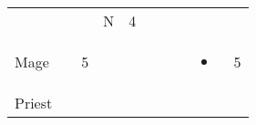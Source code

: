 \documentclass[12pt]{article}
\begin{document}
\begin{longtable}[]{@{}llllllllll@{}}
\begin{minipage}[t]{0.06\columnwidth}
\strut\end{minipage} &
\begin{minipage}[t]{0.06\columnwidth}\raggedright\strut
\strut\end{minipage} &
\begin{minipage}[t]{0.06\columnwidth}\raggedright\strut
\strut\end{minipage} &
\begin{minipage}[t]{0.07\columnwidth}\raggedright\strut
N
\strut\end{minipage} &
\begin{minipage}[t]{0.08\columnwidth}\raggedright\strut
4
\strut\end{minipage}\tabularnewline
\begin{minipage}[t]{0.13\columnwidth}\raggedright\strut
Mage
\strut\end{minipage} &
\begin{minipage}[t]{0.06\columnwidth}\raggedright\strut
\strut\end{minipage} &
\begin{minipage}[t]{0.06\columnwidth}\raggedright\strut
5
\strut\end{minipage} &
\begin{minipage}[t]{0.06\columnwidth}\raggedright\strut
\strut\end{minipage} &
\begin{minipage}[t]{0.06\columnwidth}\raggedright\strut
\strut\end{minipage} &
\begin{minipage}[t]{0.06\columnwidth}\raggedright\strut
\strut\end{minipage} &
\begin{minipage}[t]{0.06\columnwidth}\raggedright\strut
\strut\end{minipage} &
\begin{minipage}[t]{0.06\columnwidth}\raggedright\strut
\strut\end{minipage} &
\begin{minipage}[t]{0.07\columnwidth}\raggedright\strut
\begin{itemize}
\item
\end{itemize}
\strut\end{minipage} &
\begin{minipage}[t]{0.08\columnwidth}\raggedright\strut
5
\strut\end{minipage}\tabularnewline
\begin{minipage}[t]{0.13\columnwidth}\raggedright\strut
Priest
\strut\end{minipage} &

\end{longtable}
\end{document}
